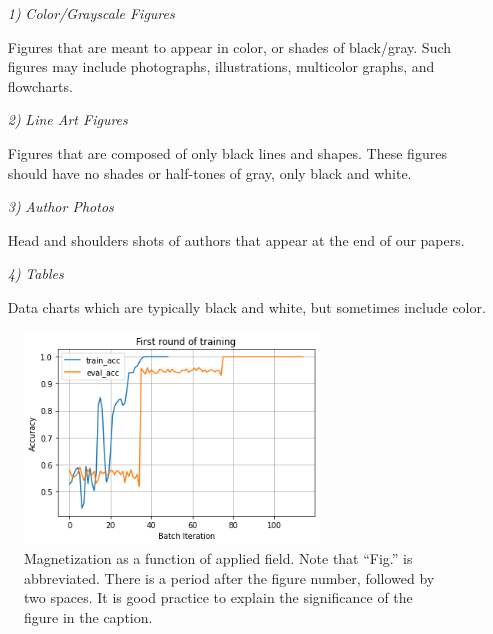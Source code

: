 \documentclass[journal]{IEEEtai}
\begin{document}
\begin{enumerate}
\item[{\it 1)}]{\it Color/Grayscale Figures}

Figures that are meant to appear in color, or shades of black/gray. Such figures may include photographs, illustrations, multicolor graphs, and flowcharts.

\item[{\it 2)}]{\it Line Art Figures}

Figures that are composed of only black lines and shapes. These figures should have no shades or half-tones of gray, only black and white.

\item[{\it 3)}]{\it Author Photos}

Head and shoulders shots of authors that appear at the end of our papers.

\item[{\it 4)}]{\it Tables}

Data charts which are typically black and white, but sometimes include color.
\end{enumerate}
\begin{figure}
\centerline{\includegraphics[width=18.5pc]{Figure1.png}}
\caption{Magnetization as a function of applied field. Note that ``Fig.'' is abbreviated. There is a period after the figure number, followed by two spaces. It is good practice to explain the significance of the figure in the caption.}
\end{figure}
\end{document}
